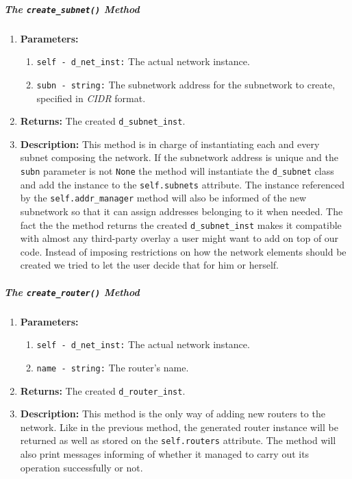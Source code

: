         \subparagraph{The \texttt{create\_subnet()} Method}
            \begin{enumerate}
                \item \textbf{Parameters:}
                \begin{enumerate}
                    \item \texttt{self - d\_net\_inst:} The actual network instance.
                    \item \texttt{subn - string:} The subnetwork address for the subnetwork to create, specified in \textit{CIDR} format.
                \end{enumerate}
                \item \textbf{Returns:} The created \texttt{d\_subnet\_inst}.
                \item \textbf{Description:} This method is in charge of instantiating each and every subnet composing the network. If the subnetwork address is unique and the \texttt{subn} parameter is not \texttt{None} the method will instantiate the \texttt{d\_subnet} class and add the instance to the \texttt{self.subnets} attribute. The instance referenced by the \texttt{self.addr\_manager} method will also be informed of the new subnetwork so that it can assign addresses belonging to it when needed. The fact the the method returns the created \texttt{d\_subnet\_inst} makes it compatible with almost any third-party overlay a user might want to add on top of our code. Instead of imposing restrictions on how the network elements should be created we tried to let the user decide that for him or herself.
            \end{enumerate}

        \subparagraph{The \texttt{create\_router()} Method}
            \begin{enumerate}
                \item \textbf{Parameters:}
                \begin{enumerate}
                    \item \texttt{self - d\_net\_inst:} The actual network instance.
                    \item \texttt{name - string:} The router's name.
                \end{enumerate}
                \item \textbf{Returns:} The created \texttt{d\_router\_inst}.
                \item \textbf{Description:} This method is the only way of adding new routers to the network. Like in the previous method, the generated router instance will be returned as well as stored on the \texttt{self.routers} attribute. The method will also print messages informing of whether it managed to carry out its operation successfully or not.
            \end{enumerate}

